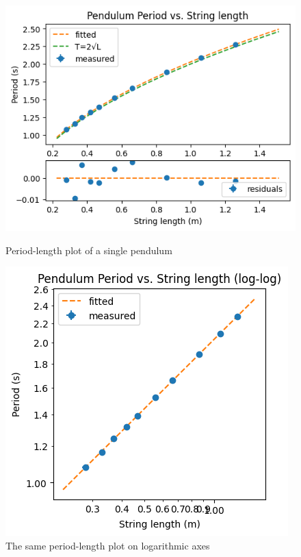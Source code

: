 \documentclass[12pt]{article}
\begin{document}
\begin{figure}[!htb]
\includegraphics[width=\linewidth]{period-length.png}
\caption{Period-length plot of a single pendulum}\label{fig:period-length}
\endminipage\hfill
{}
\includegraphics[width=\linewidth]{period-length-log.png}
\caption{The same period-length plot on logarithmic axes}\label{fig:period-length-log}
\endminipage
\end{figure}
\end{document}
